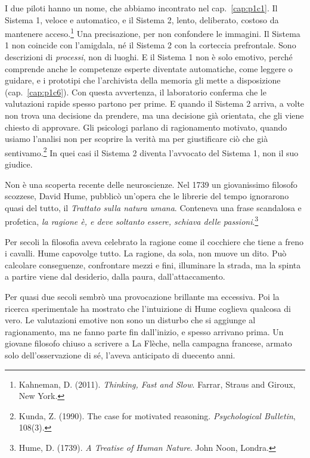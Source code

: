 I due piloti hanno un nome, che abbiamo incontrato nel cap.~\ref{cap:p1c1}. Il Sistema 1, veloce e automatico, e il Sistema 2, lento, deliberato, costoso da mantenere acceso.\footnote{Kahneman, D. (2011). \textit{Thinking, Fast and Slow}. Farrar, Straus and Giroux, New York.} Una precisazione, per non confondere le immagini. Il Sistema 1 non coincide con l'amigdala, né il Sistema 2 con la corteccia prefrontale. Sono descrizioni di \textit{processi}, non di luoghi. E il Sistema 1 non è solo emotivo, perché comprende anche le competenze esperte diventate automatiche, come leggere o guidare, e i prototipi che l'archivista della memoria gli mette a disposizione (cap.~\ref{cap:p1c6}). Con questa avvertenza, il laboratorio conferma che le valutazioni rapide spesso partono per prime. E quando il Sistema 2 arriva, a volte non trova una decisione da prendere, ma una decisione già orientata, che gli viene chiesto di approvare. Gli psicologi parlano di ragionamento motivato, quando usiamo l'analisi non per scoprire la verità ma per giustificare ciò che già sentivamo.\footnote{Kunda, Z. (1990). The case for motivated reasoning. \textit{Psychological Bulletin}, 108(3).} In quei casi il Sistema 2 diventa l'avvocato del Sistema 1, non il suo giudice.

Non è una scoperta recente delle neuroscienze. Nel 1739 un giovanissimo filosofo scozzese, David Hume, pubblicò un'opera che le librerie del tempo ignorarono quasi del tutto, il \textit{Trattato sulla natura umana}. Conteneva una frase scandalosa e profetica, \textit{la ragione è, e deve soltanto essere, schiava delle passioni}.\footnote{Hume, D. (1739). \textit{A Treatise of Human Nature}. John Noon, Londra.}

Per secoli la filosofia aveva celebrato la ragione come il cocchiere che tiene a freno i cavalli. Hume capovolge tutto. La ragione, da sola, non muove un dito. Può calcolare conseguenze, confrontare mezzi e fini, illuminare la strada, ma la spinta a partire viene dal desiderio, dalla paura, dall'attaccamento.

Per quasi due secoli sembrò una provocazione brillante ma eccessiva. Poi la ricerca sperimentale ha mostrato che l'intuizione di Hume coglieva qualcosa di vero. Le valutazioni emotive non sono un disturbo che si aggiunge al ragionamento, ma ne fanno parte fin dall'inizio, e spesso arrivano prima. Un giovane filosofo chiuso a scrivere a La Flèche, nella campagna francese, armato solo dell'osservazione di sé, l'aveva anticipato di duecento anni.

